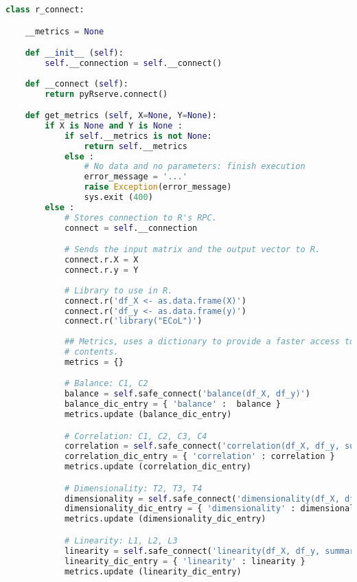 \begin{lstlisting}[language=Python, caption={Connection code to requests R ECoL 
functions}, label={lst:r-connect}]
class r_connect:

    __metrics = None

    def __init__ (self):
        self.__connection = self.__connect()
        
    def __connect (self):
        return pyRserve.connect()

    def get_metrics (self, X=None, Y=None):
        if X is None and Y is None :
            if self.__metrics is not None:
                return self.__metrics
            else :
                # No data and no parameters: finish execution
                error_message = '...'
                raise Exception(error_message)
                sys.exit (400)
        else :
            # Stores connection to R's RPC.
            connect = self.__connection

            # Sends the input matrix and the output vector to R.
            connect.r.X = X
            connect.r.y = Y
            
            # Library to use in R.
            connect.r('df_X <- as.data.frame(X)')
            connect.r('df_y <- as.data.frame(y)')
            connect.r('library("ECoL")')
            
            ## Metrics, uses a dictionary to provide a faster access to its 
            # contents.
            metrics = {}

            # Balance: C1, C2
            balance = self.safe_connect('balance(df_X, df_y)') 
            balance_dic_entry = { 'balance' :  balance }
            metrics.update (balance_dic_entry)

            # Correlation: C1, C2, C3, C4
            correlation = self.safe_connect('correlation(df_X, df_y, summary=c("mean"))') 
            correlation_dic_entry = { 'correlation' : correlation } 
            metrics.update (correlation_dic_entry)

            # Dimensionality: T2, T3, T4
            dimensionality = self.safe_connect('dimensionality(df_X, df_y, summary=c("mean"))') 
            dimensionality_dic_entry = { 'dimensionality' : dimensionality }
            metrics.update (dimensionality_dic_entry)

            # Linearity: L1, L2, L3
            linearity = self.safe_connect('linearity(df_X, df_y, summary=c("mean"))') 
            linearity_dic_entry = { 'linearity' : linearity }
            metrics.update (linearity_dic_entry)


\end{lstlisting}
